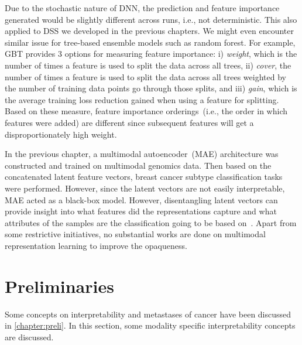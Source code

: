 \hspace*{3.5mm} Due to the stochastic nature of DNN, the prediction and feature importance generated would be slightly different across runs, i.e., not deterministic. This also applied to DSS we developed in the previous chapters. We might even encounter similar issue for tree-based ensemble models such as random forest. For example, GBT provides 3 options for measuring feature importance: i) \emph{weight}, which is the number of times a feature is used to split the data across all trees, ii) \emph{cover}, the number of times a feature is used to split the data across all trees weighted by the number of training data points go through those splits, and iii) \emph{gain}, which is the average training loss reduction gained when using a feature for splitting. Based on these measure, feature importance orderings~(i.e., the order in which features were added) are different since subsequent features will get a disproportionately high weight.

\hspace*{3.5mm} In the previous chapter, a multimodal autoencoder~(MAE) architecture was constructed and trained on multimodal genomics data. Then based on the concatenated latent feature vectors, breast cancer subtype classification tasks were performed. However, since the latent vectors are not easily interpretable, MAE acted as a black-box model. However, disentangling latent vectors can provide insight into what features did the representations capture and what attributes of the samples are the classification going to be based on~\cite{karimTCBB2020}. 
Apart from some restrictive initiatives, no substantial works are done on multimodal representation learning to improve the opaqueness.

\section{Preliminaries}
Some concepts on interpretability and metastases of cancer have been discussed in \cref{chapter:preli}. In this section, some modality specific interpretability concepts are discussed.  


